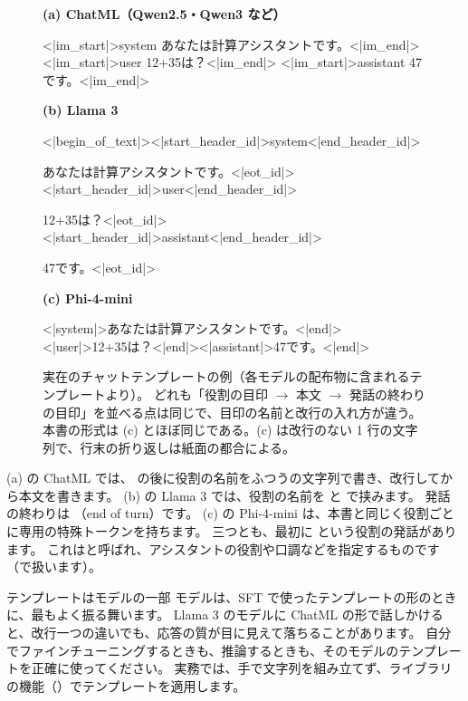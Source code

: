 \begin{figure}[tbp]
\centering
\begin{minipage}{0.95\linewidth}
\textbf{\small (a) ChatML（Qwen2.5・Qwen3 など）}
\begin{textcode}
<|im_start|>system
あなたは計算アシスタントです。<|im_end|>
<|im_start|>user
12+35は？<|im_end|>
<|im_start|>assistant
47です。<|im_end|>
\end{textcode}
\textbf{\small (b) Llama 3}
\begin{textcode}
<|begin_of_text|><|start_header_id|>system<|end_header_id|>

あなたは計算アシスタントです。<|eot_id|><|start_header_id|>user<|end_header_id|>

12+35は？<|eot_id|><|start_header_id|>assistant<|end_header_id|>

47です。<|eot_id|>
\end{textcode}
\textbf{\small (c) Phi-4-mini}
\begin{textcode}
<|system|>あなたは計算アシスタントです。<|end|><|user|>12+35は？<|end|><|assistant|>47です。<|end|>
\end{textcode}
\end{minipage}
\caption{実在のチャットテンプレートの例（各モデルの配布物に含まれるテンプレートより）。
どれも「役割の目印 $\to$ 本文 $\to$ 発話の終わりの目印」を並べる点は同じで、目印の名前と改行の入れ方が違う。
本書の形式は (c) とほぼ同じである。(c) は改行のない 1 行の文字列で、行末の折り返しは紙面の都合による。}
\label{fig:post-real-templates}
\end{figure}

(a) の ChatML では、 の後に役割の名前をふつうの文字列で書き、改行してから本文を書きます。
(b) の Llama 3 では、役割の名前を  と  で挟みます。
発話の終わりは （end of turn）です。
(c) の Phi-4-mini は、本書と同じく役割ごとに専用の特殊トークンを持ちます。
三つとも、最初に  という役割の発話があります。
これはと呼ばれ、アシスタントの役割や口調などを指定するものです（で扱います）。

\begin{caution}{テンプレートはモデルの一部}
モデルは、SFT で使ったテンプレートの形のときに、最もよく振る舞います。
Llama 3 のモデルに ChatML の形で話しかけると、改行一つの違いでも、応答の質が目に見えて落ちることがあります。
自分でファインチューニングするときも、推論するときも、そのモデルのテンプレートを正確に使ってください。
実務では、手で文字列を組み立てず、ライブラリの機能（）でテンプレートを適用します。
\end{caution}

